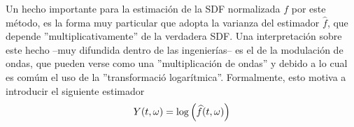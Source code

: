 %

%
%
%



%

Un hecho importante para la estimaci\'on de la SDF normalizada $f$ por este m\'etodo,
es la forma muy particular que adopta la varianza del
estimador $\widehat{f}$, que depende ''multiplicativamente'' de la verdadera SDF.
Una interpretaci\'on sobre este hecho --muy difundida dentro de las ingenier\'ias-- es el de la 
modulaci\'on de ondas, que pueden verse como una ''multiplicaci\'on de ondas'' y debido a lo cual
es com\'um el uso de la ''transformaci\'o logar\'itmica''.
Formalmente, esto motiva a introducir el siguiente estimador
\begin{equation*}
Y(t,\omega) = \log{\left( \widehat{ f }(t,\omega)\right)}
\end{equation*}

